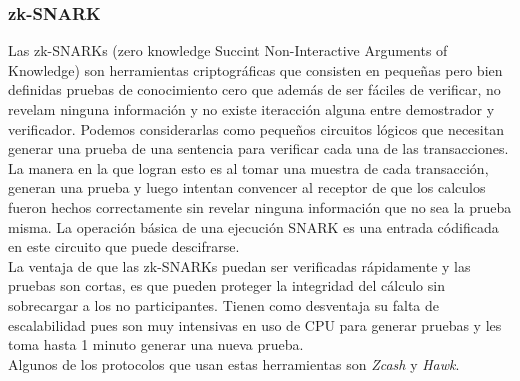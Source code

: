 \documentclass[oneside,10pt]{article}
\begin{document}
\subsubsection{zk-SNARK}
Las zk-SNARKs (zero knowledge Succint Non-Interactive Arguments of Knowledge) son herramientas criptográficas que consisten en pequeñas pero bien definidas pruebas de conocimiento cero que además de ser fáciles de verificar, no revelam ninguna información y no existe iteracción alguna entre demostrador y verificador. Podemos considerarlas como pequeños circuitos lógicos que necesitan generar una prueba de una sentencia para verificar cada una de las transacciones. La manera en la que logran esto es al tomar una muestra de cada transacción, generan una prueba y luego intentan convencer al receptor de que los calculos fueron hechos correctamente sin revelar ninguna información que no sea la prueba misma. La operación básica de una ejecución SNARK es una entrada códificada en este circuito que puede descifrarse.\\
La ventaja de que las zk-SNARKs puedan ser verificadas rápidamente y las pruebas son cortas, es que pueden proteger la integridad del cálculo sin sobrecargar a los no participantes. Tienen como desventaja su falta de escalabilidad pues son muy intensivas en uso de CPU para generar pruebas y les toma hasta 1 minuto generar una nueva prueba.\\
Algunos de los protocolos que usan estas herramientas son \emph{Zcash} y \emph{Hawk}.
\end{document}
